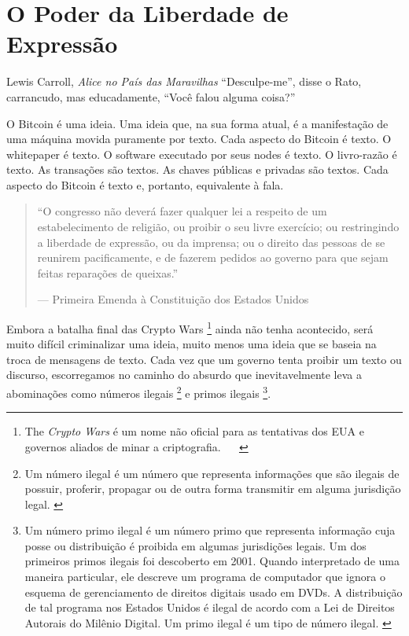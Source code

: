 \chapter{O Poder da Liberdade de Expressão}
\label{les:6}

\begin{chapquote}{Lewis Carroll, \textit{Alice no País das Maravilhas}}
\enquote{Desculpe-me}, disse o Rato, carrancudo, mas educadamente, \enquote{Você falou alguma coisa?}
\end{chapquote}

O Bitcoin é uma ideia. Uma ideia que, na sua forma atual, é a manifestação de uma máquina movida puramente por texto. Cada aspecto do Bitcoin é texto. O whitepaper é texto. O software executado por seus nodes é texto. O livro-razão é texto. As transações são textos. As chaves públicas e privadas são textos. Cada aspecto do Bitcoin é texto e, portanto, equivalente à fala.

\begin{quotation}\begin{samepage}
\enquote{O congresso não deverá fazer qualquer lei a respeito de um estabelecimento de religião, ou proibir o seu livre exercício; ou restringindo a liberdade de expressão, ou da imprensa; ou o direito das pessoas de se reunirem pacificamente, e de fazerem pedidos ao governo para que sejam feitas reparações de queixas.}
\begin{flushright} --- Primeira Emenda à Constituição dos Estados Unidos
\end{flushright}\end{samepage}\end{quotation}

Embora a batalha final das Crypto Wars \footnote{The \textit{Crypto Wars} é um nome não oficial para as tentativas dos EUA e governos aliados de minar a criptografia. ~\cite{eff-cryptowars} ~\cite{wiki:cryptowars}} ainda não tenha acontecido, será muito difícil criminalizar uma ideia, muito menos uma ideia que se baseia na troca de mensagens de texto. Cada vez que um governo tenta proibir um texto ou discurso, escorregamos no caminho do absurdo que inevitavelmente leva a abominações como números ilegais \footnote{Um número ilegal é um número que representa informações que são ilegais de possuir, proferir, propagar ou de outra forma transmitir em alguma jurisdição legal. \cite{wiki:illegal-number}} e primos ilegais \footnote{Um número primo ilegal é um número primo que representa informação cuja posse ou distribuição é proibida em algumas jurisdições legais. Um dos primeiros primos ilegais foi descoberto em 2001. Quando interpretado de uma maneira particular, ele descreve um programa de computador que ignora o esquema de gerenciamento de direitos digitais usado em DVDs. A distribuição de tal programa nos Estados Unidos é ilegal de acordo com a Lei de Direitos Autorais do Milênio Digital. Um primo ilegal é um tipo de número ilegal. \cite{wiki:illegal-prime}}.

